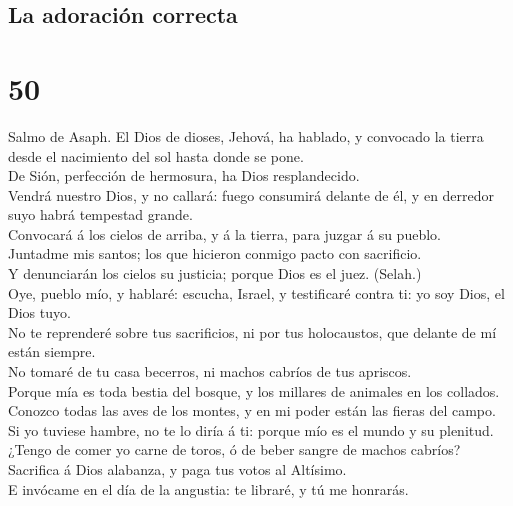 \hypertarget{la-adoraciuxf3n-correcta}{%
\subsection{La adoración correcta}\label{la-adoraciuxf3n-correcta}}

\hypertarget{section-19-50}{%
\section{50}\label{section-19-50}}

 Salmo de Asaph. El Dios de dioses, Jehová, ha hablado, y
convocado la tierra desde el nacimiento del sol hasta donde se pone.\\
 De Sión, perfección de hermosura, ha Dios
resplandecido.\\
 Vendrá nuestro Dios, y no callará: fuego consumirá
delante de él, y en derredor suyo habrá tempestad grande.\\
 Convocará á los cielos de arriba, y á la tierra, para
juzgar á su pueblo.\\
 Juntadme mis santos; los que hicieron conmigo pacto con
sacrificio.\\
 Y denunciarán los cielos su justicia; porque Dios es el
juez. (Selah.)\\
 Oye, pueblo mío, y hablaré: escucha, Israel, y
testificaré contra ti: yo soy Dios, el Dios tuyo.\\
 No te reprenderé sobre tus sacrificios, ni por tus
holocaustos, que delante de mí están siempre.\\
 No tomaré de tu casa becerros, ni machos cabríos de tus
apriscos.\\
 Porque mía es toda bestia del bosque, y los millares de
animales en los collados.\\
 Conozco todas las aves de los montes, y en mi poder
están las fieras del campo.\\
 Si yo tuviese hambre, no te lo diría á ti: porque mío es
el mundo y su plenitud.\\
 ¿Tengo de comer yo carne de toros, ó de beber sangre de
machos cabríos?\\
 Sacrifica á Dios alabanza, y paga tus votos al
Altísimo.\\
 E invócame en el día de la angustia: te libraré, y tú me
honrarás.\\
